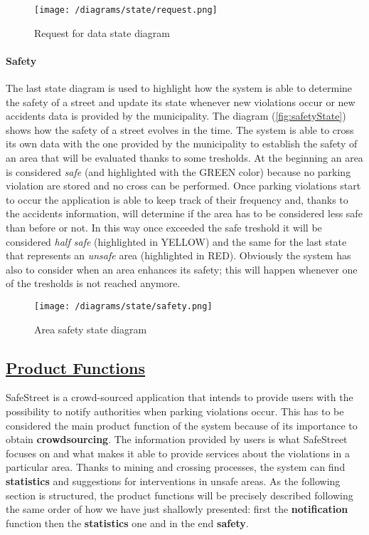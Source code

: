 		\vspace{0.3cm}
		\begin{figure}[h]
			\centering
			\texttt{[image: /diagrams/state/request.png]}
			\caption{\label{fig:requestState}Request for data state diagram}
		\end{figure}
	
	\paragraph{Safety}
		The last state diagram is used to highlight how the system is able to determine the safety of a street and update its state whenever new violations occur or new accidents data is provided by the municipality. 
		The diagram (\autoref{fig:safetyState}) shows how the safety of a street evolves in the time. The system is able to cross its own data with the one provided by the municipality to establish the safety of an area that will be evaluated thanks to some tresholds. At the beginning an area is considered \textit{safe} (and highlighted with the GREEN color) because no parking violation are stored and no cross can be performed. Once parking violations start to occur the application is able to keep track of their frequency and, thanks to the accidents information, will determine if the area has to be considered less safe than before or not. In this way once exceeded the safe treshold it will be considered \textit{half safe} (highlighted in YELLOW) and the same for the last state that represents an \textit{unsafe} area (highlighted in RED). Obviously the system has also to consider when an area enhances its safety; this will happen whenever one of the tresholds is not reached anymore. 
		
		\vspace{0.3cm}
		\begin{figure}[h]
			\centering
			\texttt{[image: /diagrams/state/safety.png]}
			\caption{\label{fig:safetyState}Area safety state diagram}
		\end{figure}   

\subsection[Product Functions]{\hyperlink{toc}{Product Functions}}
	\label{sec:productFunctions}
	SafeStreet is a crowd-sourced application that intends to provide users with the possibility to notify authorities when parking violations occur. This has to be considered the main product function of the system because of its importance to obtain \textbf{crowdsourcing}. The information provided by users is what SafeStreet focuses on and what makes it able to provide services about the violations in a particular area. Thanks to mining and crossing processes, the system can find \textbf{statistics} and suggestions for interventions in unsafe areas. As the following section is structured, the product functions will be precisely described following the same order of how we have just shallowly presented: first the \textbf{notification} function then the \textbf{statistics} one and in the end \textbf{safety}.
	
